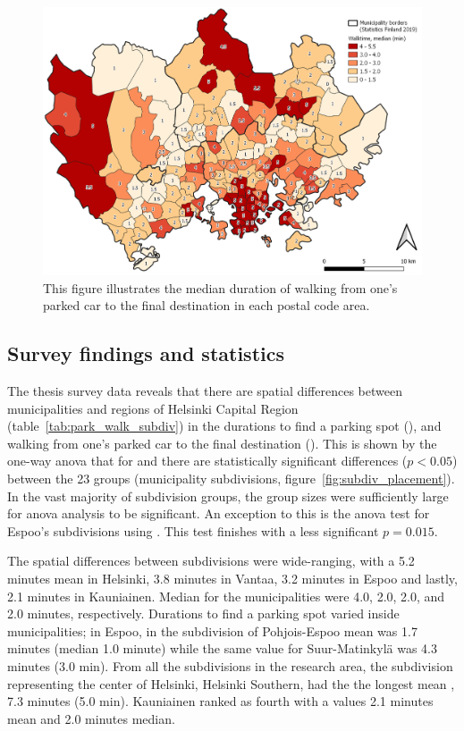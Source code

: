 \begin{figure}[H]%
    \centering
    \includegraphics[width=.88\textwidth]{images/thesis_postalvis_walkmedian.png}
    \caption[Walktime, median, in the research area]{This figure illustrates the median duration of walking from one's parked car to the final destination in each postal code area.}%
    \label{fig:postalvis_walkmedian}%
\end{figure}

\newpage
\subsection{Survey findings and statistics}
\justify

The thesis survey data reveals that there are spatial differences between municipalities and regions of Helsinki Capital Region (table~\ref{tab:park_walk_subdiv}) in the durations to find a parking spot (), and walking from one's parked car to the final destination (). This is shown by the one-way \acrfull{anova} that for  and  there are statistically significant differences ($p < 0.05$) between the 23 groups (municipality subdivisions, figure~\ref{fig:subdiv_placement}). In the vast majority of subdivision groups, the group sizes were sufficiently large for \acrshort{anova} analysis to be significant. An exception to this is the \acrshort{anova} test for Espoo's subdivisions using . This test finishes with a less significant $p = 0.015$.

The spatial differences between subdivisions were wide-ranging, with a 5.2 minutes mean  in Helsinki, 3.8 minutes in Vantaa, 3.2 minutes in Espoo and lastly, 2.1 minutes in Kauniainen. Median  for the municipalities were 4.0, 2.0, 2.0, and 2.0 minutes, respectively. Durations to find a parking spot varied inside municipalities; in Espoo, in the subdivision of Pohjois-Espoo mean  was 1.7 minutes (median 1.0 minute) while the same value for Suur-Matinkylä was 4.3 minutes (3.0 min). From all the subdivisions in the research area, the subdivision representing the center of Helsinki, Helsinki Southern, had the the longest mean , 7.3 minutes (5.0 min). Kauniainen ranked as fourth with a  values 2.1 minutes mean and 2.0 minutes median.

